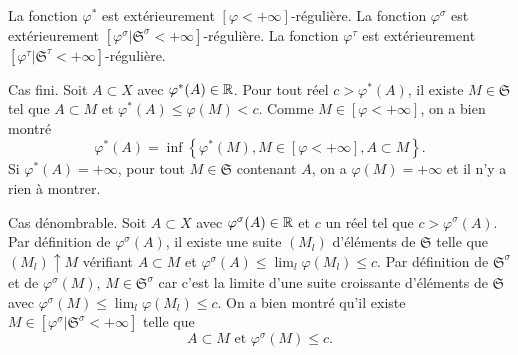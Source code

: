 \begin{prop}
 La fonction $\varphi^*$ est extérieurement $[\varphi < +\infty]$-régulière.\newline
 La fonction $\varphi^\sigma$ est extérieurement $[\varphi^\sigma|\mathfrak{S}^{\sigma} < +\infty]$-régulière.\newline
 La fonction $\varphi^\tau$ est extérieurement $[\varphi^\tau|\mathfrak{S}^{\tau} < +\infty]$-régulière.
\end{prop}
\begin{demo}
 Cas fini.\newline
 Soit $A \subset X$ avec $\varphi^*(A) \in \mathbb{R}$. Pour tout réel $c > \varphi^*(A)$, il existe $M \in \mathfrak{S}$ tel que $A \subset M$ et $\varphi^*(A) \leq \varphi(M) < c$. Comme $M \in [\varphi < +\infty]$, on a bien montré
 \begin{displaymath}
  \varphi^*(A) = \inf\left\lbrace \varphi^*(M) , M \in [\varphi < +\infty], A \subset M \right\rbrace.
 \end{displaymath}
Si $\varphi^*(A)= +\infty$, pour tout $M\in \mathfrak{S}$ contenant $A$, on a $\varphi(M) = + \infty$ et il n'y a rien à montrer.

Cas dénombrable.\newline
Soit $A \subset X$ avec $\varphi^\sigma(A) \in \mathbb{R}$ et $c$ un réel tel que $c > \varphi^\sigma(A)$.\newline
Par définition de $\varphi^\sigma(A)$, il existe une suite $(M_l)$ d'éléments de $\mathfrak{S}$ telle que  $(M_l)\uparrow M$  vérifiant  $A \subset M$ et $\varphi^\sigma(A) \leq \lim_l \varphi(M_l) \leq c$.\newline
Par définition de $\mathfrak{S}^\sigma$ et de $\varphi^\sigma(M)$, $M \in \mathfrak{S}^\sigma$ car c'est la limite d'une suite croissante d'éléments de $\mathfrak{S}$ avec $\varphi^\sigma(M) \leq  \lim_l \varphi(M_l) \leq c$.\newline
On a bien montré qu'il existe $M \in [\varphi^\sigma|\mathfrak{S}^{\sigma} < +\infty]$ telle que
\begin{displaymath}
 A \subset M \text{ et } \varphi^\sigma(M)  \leq c.
\end{displaymath}


\end{demo}

